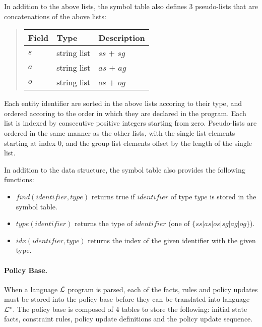 \documentclass[10pt, twocolumn]{article}
\begin{document}
          In addition to the above lists, the symbol table also defines 3
          pseudo-lists that are concatenations of the above lists:

          \begin{quote}
            \begin{tabular}[t]{|l|l|l|}
              \hline
              \textbf{Field} & \textbf{Type} & \textbf{Description} \\
              \hline
              $s$ & string list & $ss$ $+$ $sg$ \\
              \hline
              $a$ & string list & $as$ $+$ $ag$ \\
              \hline
              $o$ & string list & $os$ $+$ $og$ \\
              \hline
            \end{tabular}
          \end{quote}

          Each entity identifier are sorted in the above lists accoring to
          their type, and ordered accoring to the order in which they are
          declared in the program. Each list is indexed by consecutive
          positive integers starting from zero. Pseudo-lists are ordered in
          the same manner as the other lists, with the single list elements
          starting at index 0, and the group list elements offset by the
          length of the single list.

          In addition to the data structure, the symbol table also provides
          the following functions:

          \begin{itemize}
            \item
              $find(identifier, type)$ returns true if $identifier$ of type
              $type$ is stored in the symbol table.
            \item
              $type(identifier)$ returns the type of $identifier$ (one of
              $\{ss|as|os|sg|ag|og\}$).
            \item
              $idx(identifier, type)$ returns the index of the given identifier
              with the given type.
          \end{itemize}

        \paragraph{Policy Base.}

          When a language ${\cal L}$ program is parsed, each of the facts,
          rules and policy updates must be stored into the policy base before
          they can be translated into language $\cal L^{*}$. The policy base is
          composed of 4 tables to store the following: initial state facts,
          constraint rules, policy update definitions and the policy update
          sequence.
\end{document}
